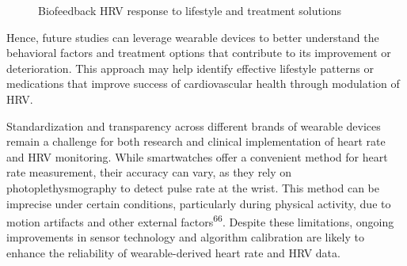 \documentclass[
  a4paper,
  headsepline=true,
  open=any]{scrbook}
\begin{document}
\begin{figure}

\begin{minipage}[t]{\linewidth}

{\centering 


\caption{Biofeedback HRV response to lifestyle and treatment solutions}

}

\end{minipage}%

\end{figure}

Hence, future studies can leverage wearable devices to better understand
the behavioral factors and treatment options that contribute to its
improvement or deterioration. This approach may help identify effective
lifestyle patterns or medications that improve success of cardiovascular
health through modulation of HRV.

Standardization and transparency across different brands of wearable
devices remain a challenge for both research and clinical implementation
of heart rate and HRV monitoring. While smartwatches offer a convenient
method for heart rate measurement, their accuracy can vary, as they rely
on photoplethysmography to detect pulse rate at the wrist. This method
can be imprecise under certain conditions, particularly during physical
activity, due to motion artifacts and other external
factors\textsuperscript{66}. Despite these limitations, ongoing
improvements in sensor technology and algorithm calibration are likely
to enhance the reliability of wearable-derived heart rate and HRV data.
\end{document}
